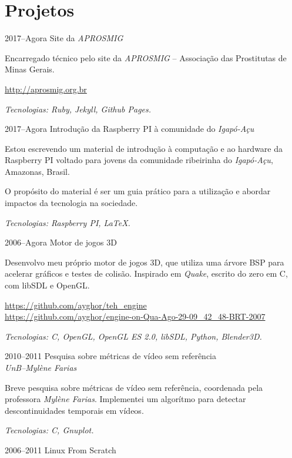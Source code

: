 \documentclass[a4paper]{simplecv}
\begin{document}
\section{Projetos}

\begin{topic}
\item[2017--Agora] Site da \emph{APROSMIG}

	Encarregado técnico pelo site da \emph{APROSMIG} -- Associação das
	Prostitutas de Minas Gerais.

	{\scriptsize\url{http://aprosmig.org.br}}

	{\em\scriptsize Tecnologias: Ruby, Jekyll, Github Pages.}

\item[2017--Agora] Introdução da Raspberry PI à comunidade do \emph{Igapó-Açu}

	Estou escrevendo um material de introdução à computação e ao hardware
	da Raspberry PI voltado para jovens da comunidade ribeirinha do
	\emph{Igapó-Açu}, Amazonas, Brasil.

	O propósito do material é ser um guia prático para a utilização e
	abordar impactos da tecnologia na sociedade.

	{\em\scriptsize Tecnologias: Raspberry PI, \LaTeX{}.}

\item[2006--Agora] Motor de jogos 3D

	Desenvolvo meu próprio motor de jogos 3D, que utiliza uma árvore BSP
	para acelerar gráficos e testes de colisão. Inspirado em \emph{Quake},
	escrito do zero em C, com libSDL e OpenGL.

	{\scriptsize\url{https://github.com/ayghor/teh_engine}}\\
	{\scriptsize\url{https://github.com/ayghor/engine-on-Qua-Ago-29-09\_42\_48-BRT-2007}}

	{\em\scriptsize Tecnologias: C, OpenGL, OpenGL ES 2.0, libSDL, Python,
	Blender3D.}

\item[2010--2011] Pesquisa sobre métricas de vídeo sem referência\\
	{\em\small UnB--Mylène Farias}

	Breve pesquisa sobre métricas de vídeo sem referência, coordenada pela
	professora \emph{Mylène Farias}. Implementei um algorítmo para detectar
	descontinuidades temporais em vídeos.

	{\em\scriptsize Tecnologias: C, Gnuplot.}

\item[2006--2011] Linux From Scratch


\end{topic}
\end{document}
